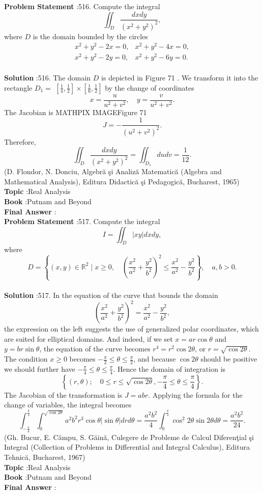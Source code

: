 \documentclass[10pt]{article}
\begin{document}
\textbf{Problem Statement} :516. Compute the integral$$ \iint_{D} \frac{d x d y}{\left(x^{2}+y^{2}\right)^{2}}, $$where $D$ is the domain bounded by the circles$$ \begin{array}{ll} x^{2}+y^{2}-2 x=0, & x^{2}+y^{2}-4 x=0, \\ x^{2}+y^{2}-2 y=0, & x^{2}+y^{2}-6 y=0 . \end{array} $$\\
\textbf{Solution} :516. The domain $D$ is depicted in Figure 71 . We transform it into the rectangle $D_{1}=$ $\left[\frac{1}{4}, \frac{1}{2}\right] \times\left[\frac{1}{6}, \frac{1}{2}\right]$ by the change of coordinates$$ x=\frac{u}{u^{2}+v^{2}}, \quad y=\frac{v}{u^{2}+v^{2}} . $$The Jacobian is MATHPIX IMAGEFigure 71$$ J=-\frac{1}{\left(u^{2}+v^{2}\right)^{2}} . $$Therefore,$$ \iint_{D} \frac{d x d y}{\left(x^{2}+y^{2}\right)^{2}}=\iint_{D_{1}} d u d v=\frac{1}{12} . $$(D. Flondor, N. Donciu, Algebră şi Analiză Matematică (Algebra and Mathematical Analysis), Editura Didactică şi Pedagogică, Bucharest, 1965)\\
\textbf{Topic} :Real Analysis\\
\textbf{Book} :Putnam and Beyond\\
\textbf{Final Answer} :\\


\textbf{Problem Statement} :517. Compute the integral$$ I=\iint_{D}|x y| d x d y, $$where$$ D=\left\{(x, y) \in \mathbb{R}^{2} \mid x \geq 0, \quad\left(\frac{x^{2}}{a^{2}}+\frac{y^{2}}{b^{2}}\right)^{2} \leq \frac{x^{2}}{a^{2}}-\frac{y^{2}}{b^{2}}\right\}, \quad a, b>0 . $$\\
\textbf{Solution} :517. In the equation of the curve that bounds the domain$$ \left(\frac{x^{2}}{a^{2}}+\frac{y^{2}}{b^{2}}\right)^{2}=\frac{x^{2}}{a^{2}}-\frac{y^{2}}{b^{2}}, $$the expression on the left suggests the use of generalized polar coordinates, which are suited for elliptical domains. And indeed, if we set $x=a r \cos \theta$ and $y=b r \sin \theta$, the equation of the curve becomes $r^{4}=r^{2} \cos 2 \theta$, or $r=\sqrt{\cos 2 \theta}$. The condition $x \geq 0$ becomes $-\frac{\pi}{2} \leq \theta \leq \frac{\pi}{2}$, and because $\cos 2 \theta$ should be positive we should further have $-\frac{\pi}{4} \leq \theta \leq \frac{\pi}{4}$. Hence the domain of integration is$$ \left\{(r, \theta) ; \quad 0 \leq r \leq \sqrt{\cos 2 \theta},-\frac{\pi}{4} \leq \theta \leq \frac{\pi}{4}\right\} . $$The Jacobian of the transformation is $J=a b r$. Applying the formula for the change of variables, the integral becomes$$ \int_{-\frac{\pi}{4}}^{\frac{\pi}{4}} \int_{0}^{\sqrt{\cos 2 \theta}} a^{2} b^{2} r^{3} \cos \theta|\sin \theta| d r d \theta=\frac{a^{2} b^{2}}{4} \int_{0}^{\frac{\pi}{4}} \cos ^{2} 2 \theta \sin 2 \theta d \theta=\frac{a^{2} b^{2}}{24} . $$(Gh. Bucur, E. Câmpu, S. Găină, Culegere de Probleme de Calcul Diferenţial şi Integral (Collection of Problems in Differential and Integral Calculus), Editura Tehnică, Bucharest, 1967)\\
\textbf{Topic} :Real Analysis\\
\textbf{Book} :Putnam and Beyond\\
\textbf{Final Answer} :\\
\end{document}
